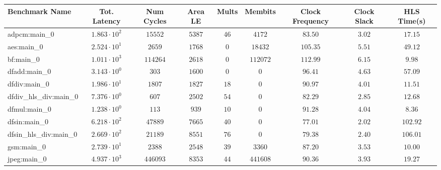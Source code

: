 \begin{tabular}{|l|c|c|c|c|c|c|c|c|}
\hline
Benchmark Name          & Tot. Latency           & Num Cycles & Area LE   & Mults   & Membits    & Clock Frequency & Clock Slack & HLS Time(s) \\
\hline
adpcm:main\_0           & $ 1.863 \cdot 10^{2} $ & $ 15552  $ & $ 5387  $ & $ 46  $ & $ 4172   $ & $ 83.50       $ & $ 3.02    $ & $ 17.15   $ \\
aes:main\_0             & $ 2.524 \cdot 10^{1} $ & $ 2659   $ & $ 1768  $ & $ 0   $ & $ 18432  $ & $ 105.35      $ & $ 5.51    $ & $ 49.12   $ \\
bf:main\_0              & $ 1.011 \cdot 10^{3} $ & $ 114264 $ & $ 2618  $ & $ 0   $ & $ 112072 $ & $ 112.99      $ & $ 6.15    $ & $ 9.98    $ \\
dfadd:main\_0           & $ 3.143 \cdot 10^{0} $ & $ 303    $ & $ 1600  $ & $ 0   $ & $ 0      $ & $ 96.41       $ & $ 4.63    $ & $ 57.09   $ \\
dfdiv:main\_0           & $ 1.986 \cdot 10^{1} $ & $ 1807   $ & $ 1827  $ & $ 18  $ & $ 0      $ & $ 90.97       $ & $ 4.01    $ & $ 11.51   $ \\
dfdiv\_hls\_div:main\_0 & $ 7.376 \cdot 10^{0} $ & $ 607    $ & $ 2502  $ & $ 54  $ & $ 0      $ & $ 82.29       $ & $ 2.85    $ & $ 12.68   $ \\
dfmul:main\_0           & $ 1.238 \cdot 10^{0} $ & $ 113    $ & $ 939   $ & $ 10  $ & $ 0      $ & $ 91.28       $ & $ 4.04    $ & $ 8.36    $ \\
dfsin:main\_0           & $ 6.218 \cdot 10^{2} $ & $ 47889  $ & $ 7665  $ & $ 40  $ & $ 0      $ & $ 77.01       $ & $ 2.02    $ & $ 102.92  $ \\
dfsin\_hls\_div:main\_0 & $ 2.669 \cdot 10^{2} $ & $ 21189  $ & $ 8551  $ & $ 76  $ & $ 0      $ & $ 79.38       $ & $ 2.40    $ & $ 106.01  $ \\
gsm:main\_0             & $ 2.739 \cdot 10^{1} $ & $ 2388   $ & $ 2548  $ & $ 39  $ & $ 3360   $ & $ 87.20       $ & $ 3.53    $ & $ 10.00   $ \\
jpeg:main\_0            & $ 4.937 \cdot 10^{3} $ & $ 446093 $ & $ 8353  $ & $ 44  $ & $ 441608 $ & $ 90.36       $ & $ 3.93    $ & $ 19.27   $ \\

\end{tabular}
